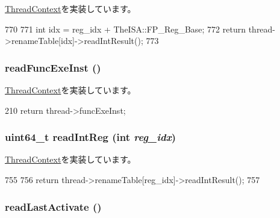 \hyperlink{classThreadContext_a66bf9e1bf11ad15d1903209dd37014c5}{ThreadContext}を実装しています。


\begin{DoxyCode}
770 {
771     int idx = reg_idx + TheISA::FP_Reg_Base;
772     return thread->renameTable[idx]->readIntResult();
773 }
\end{DoxyCode}
\hypertarget{classOzoneCPU_1_1OzoneTC_a2b0bef6e1b1ac24e9322fbd09a511d11}{
\subsubsection[{readFuncExeInst}]{ readFuncExeInst ()}}
\label{classOzoneCPU_1_1OzoneTC_a2b0bef6e1b1ac24e9322fbd09a511d11}


\hyperlink{classThreadContext_ae9aa32b63846c7bae5f2b6d899bdbf9c}{ThreadContext}を実装しています。


\begin{DoxyCode}
210 { return thread->funcExeInst; }
\end{DoxyCode}
\hypertarget{classOzoneCPU_1_1OzoneTC_a21c850cd41ab977a2cf3450fe66ec25a}{
\subsubsection[{readIntReg}]{\setlength{\rightskip}{0pt plus 5cm}uint64\_\-t readIntReg (int {\em reg\_\-idx})}}
\label{classOzoneCPU_1_1OzoneTC_a21c850cd41ab977a2cf3450fe66ec25a}


\hyperlink{classThreadContext_af80734776d68e6acd48e22f6c999394a}{ThreadContext}を実装しています。


\begin{DoxyCode}
755 {
756     return thread->renameTable[reg_idx]->readIntResult();
757 }
\end{DoxyCode}
\hypertarget{classOzoneCPU_1_1OzoneTC_afaa8f9eb8d809cccd31829ba793a433a}{
\subsubsection[{readLastActivate}]{ readLastActivate ()}}
\label{classOzoneCPU_1_1OzoneTC_afaa8f9eb8d809cccd31829ba793a433a}


